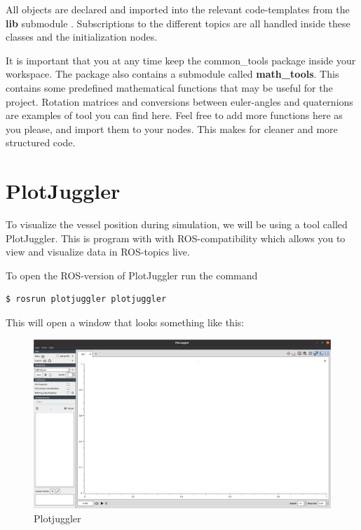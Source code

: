 \documentclass{ol-softwaremanual}
\begin{document}
All objects are declared and imported into the relevant code-templates from the \textbf{lib} submodule . Subscriptions to the different topics are all handled inside these classes and the initialization nodes.

It is important that you at any time keep the common\_tools package inside your workspace. The package also contains a submodule called \textbf{math\_tools}. This contains some predefined mathematical functions that may be useful for the project. Rotation matrices and conversions between euler-angles and quaternions are examples of tool you can find here. Feel free to add more functions here as you please, and import them to your nodes. This makes for cleaner and more structured code. 

\section{PlotJuggler}

To visualize the vessel position during simulation, we will be using a tool called PlotJuggler. This is program with with ROS-compatibility which allows you to view and visualize data in ROS-topics live. 

To open the ROS-version of PlotJuggler run the command 

\begin{lstlisting}[language=bash,basicstyle=\mlttfamily, breaklines=true]
  $ rosrun plotjuggler plotjuggler 
\end{lstlisting}

This will open a window that looks something like this: 

\begin{figure}[h]
    \centering
    \includegraphics[width=\textwidth]{plotjuggler.png}
    \caption{Plotjuggler}
    \label{fig:plotjuggler}
\end{figure}
\end{document}
